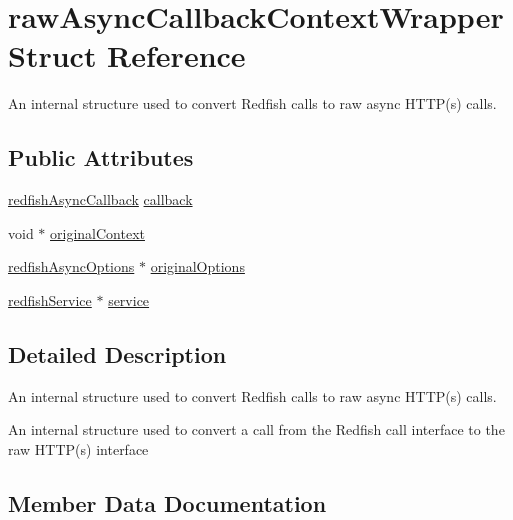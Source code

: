 \hypertarget{structrawAsyncCallbackContextWrapper}{}\section{raw\+Async\+Callback\+Context\+Wrapper Struct Reference}
\label{structrawAsyncCallbackContextWrapper}


An internal structure used to convert Redfish calls to raw async H\+T\+T\+P(s) calls.  


\subsection*{Public Attributes}
\begin{DoxyCompactItemize}
\item 
\hyperlink{redfishService_8h_a13c86956ea56ba1940a2b662e317264e}{redfish\+Async\+Callback} \hyperlink{structrawAsyncCallbackContextWrapper_ac3d8c4b4d27c42d1f57d8ac703a72d6e}{callback}
\item 
void $\ast$ \hyperlink{structrawAsyncCallbackContextWrapper_a42e81ff47b8707ccba35e3c7860b0311}{original\+Context}
\item 
\hyperlink{structredfishAsyncOptions}{redfish\+Async\+Options} $\ast$ \hyperlink{structrawAsyncCallbackContextWrapper_a696d24a53bf1d16a69a9163ce9db6cbc}{original\+Options}
\item 
\hyperlink{redfishService_8h_a4c9115c0f0a21de971c0dfae06f26372}{redfish\+Service} $\ast$ \hyperlink{structrawAsyncCallbackContextWrapper_a6a17937ff77e2b5efca6938279e31eaa}{service}
\end{DoxyCompactItemize}


\subsection{Detailed Description}
An internal structure used to convert Redfish calls to raw async H\+T\+T\+P(s) calls. 

An internal structure used to convert a call from the Redfish call interface to the raw H\+T\+T\+P(s) interface 

\subsection{Member Data Documentation}
\mbox{\label{structrawAsyncCallbackContextWrapper_ac3d8c4b4d27c42d1f57d8ac703a72d6e}} 
